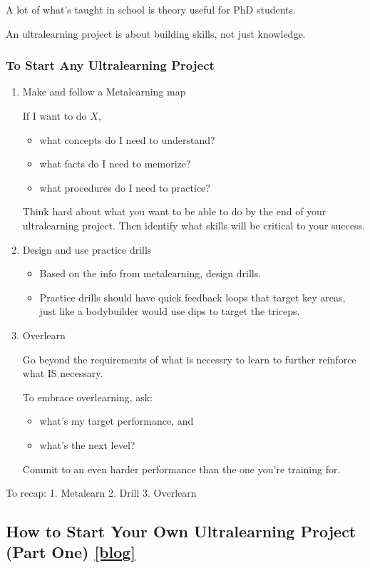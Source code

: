 A lot of what's taught in school is theory useful for PhD students.

An ultralearning project is about building skills, not just knowledge.

\subsubsection*{To Start Any Ultralearning Project}
\begin{enumerate}
	\item Make and follow a Metalearning map

	If I want to do $X$,
	\begin{itemize}
		\item what concepts do I need to understand?
		\item what facts do I need to memorize?
		\item what procedures do I need to practice?
	\end{itemize}


	Think hard about what you want to be able to do by the end of your ultralearning project. Then identify what skills will be critical to your success.

	\item Design and use practice drills
	\begin{itemize}
		\item Based on the info from metalearning, design drills.
		\item Practice drills should have quick feedback loops that target key areas, just like a bodybuilder would use dips to target the triceps.
	\end{itemize}

	\item Overlearn

	Go beyond the requirements of what is necessry to learn to further reinforce what IS necessary.

	To embrace overlearning, ask:
	\begin{itemize}
		\item what's my target performance, and
		\item what's the next level?
	\end{itemize}

	Commit to an even harder performance than the one you're training for.
\end{enumerate}

To recap:
1. Metalearn
2. Drill
3. Overlearn

\subsection{How to Start Your Own Ultralearning Project (Part One) \href{https://www.scotthyoung.com/blog/2016/07/28/ultralearn-diy-1/}{[blog]}}

